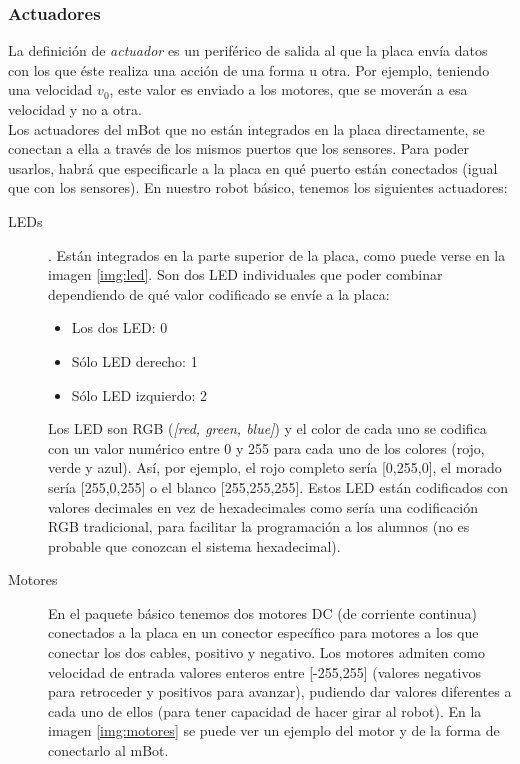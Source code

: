 \subsubsection{Actuadores}\label{subsec:actuadores}
	La definición de \textit{actuador} es un periférico de salida al que la placa envía datos con los que éste realiza una acción de una forma u otra. Por ejemplo, teniendo una velocidad $v_0$, este valor es enviado a los motores, que se moverán a esa velocidad y no a otra. \\
	Los actuadores del mBot que no están integrados en la placa directamente, se conectan a ella a través de los mismos puertos que los sensores. Para poder usarlos, habrá que especificarle a la placa en qué puerto están conectados (igual que con los sensores). En nuestro robot básico, tenemos los siguientes actuadores:
	\begin{description}
	\item [LEDs]. Están integrados en la parte superior de la placa, como puede verse en la imagen \ref{img:led}. Son dos LED individuales que poder combinar dependiendo de qué valor codificado se envíe a la placa:
	\begin{itemize}
		\item Los dos LED: 0
		\item Sólo LED derecho: 1
		\item Sólo LED izquierdo: 2
	\end{itemize}
	Los LED son RGB (\textit{[red, green, blue]}) y el color de cada uno se codifica con un valor numérico entre 0 y 255 para cada uno de los colores (rojo, verde y azul). Así, por ejemplo, el rojo completo sería [0,255,0], el morado sería [255,0,255] o el blanco [255,255,255]. Estos LED están codificados con valores decimales en vez de hexadecimales como sería una codificación RGB tradicional, para facilitar la programación a los alumnos (no es probable que conozcan el sistema hexadecimal).		
	
	\item [Motores] En el paquete básico tenemos dos motores DC (de corriente continua) conectados a la placa en un conector específico para motores a los que conectar los dos cables, positivo y negativo. Los motores admiten como velocidad de entrada valores enteros entre [-255,255] (valores negativos para retroceder y positivos para avanzar), pudiendo dar valores diferentes a cada uno de ellos (para tener capacidad de hacer girar al robot). En la imagen \ref{img:motores} se puede ver un ejemplo del motor y de la forma de conectarlo al mBot.	


\end{description}
